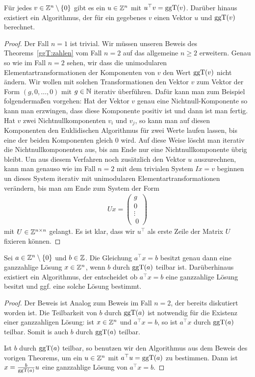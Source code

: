 	\begin{thm} 
		Für jedes $v \in \mathbb Z^n \setminus \{0\}$ gibt es ein $u \in \mathbb Z^n$ mit $u^\top v = \operatorname{ggT}(v)$. Darüber hinaus existiert ein Algorithmus, der für ein gegebenes $v$ einen Vektor $u$ und $\operatorname{ggT}(v)$ berechnet. 
	\end{thm} 
	\begin{proof} 
		Der Fall $n =1$ ist trivial. 
		Wir müssen unseren Beweis des Theorems~\ref{ggT:zahlen} vom Fall $n=2$ auf das allgemeine $n \ge 2$ erweitern. Genau so wie im Fall $n=2$ sehen, wir dass die unimodularen Elementartransformationen der Komponenten von $v$ den Wert $\operatorname{ggT}(v)$ nicht ändern. Wir wollen mit solchen Transformationen den Vektor $v$ zum Vektor der Form $(g,0,\ldots, 0)$ mit $g \in \mathbb N$ iterativ überführen. Dafür kann man zum Beispiel folgendermaßen vorgehen: Hat der Vektor $v$ genau eine Nichtnull-Komponente so kann man erzwingen, dass diese Komponente positiv ist und dann ist man fertig. Hat $v$ zwei Nichtnullkomponenten $v_i$ und $v_j$, so kann man auf diesen Komponenten den Euklidischen Algorithmus für zwei Werte laufen lassen, bis eine der beiden Komponenten gleich $0$ wird. Auf diese Weise löscht man iterativ die Nichtnullkomponenten aus, bis am Ende nur eine Nichtnullkomponente übrig bleibt. Um aus diesem Verfahren noch zusätzlich den Vektor $u$ auszurechnen, kann man genauso wie im Fall $n=2$ mit dem trivialen System $I x = v$ beginnen un dieses System iterativ mit unimodularen Elementartransformationen verändern, bis man am Ende zum System der Form 
		\begin{align*}
			U x = \begin{pmatrix} g \\ 0 \\ \vdots \\\ 0 \end{pmatrix} 
		\end{align*} 
		mit $U \in \mathbb Z^{n \times n}$ gelangt. Es ist klar, dass wir $u^\top$ als erste Zeile der Matrix $U$ fixieren können. 
	\end{proof} 
	
	
	\begin{klr}
		Sei $a \in \mathbb Z^n \setminus \{0\}$ und $b \in \mathbb Z$. Die Gleichung $a^\top x = b$ besitzt genau dann eine ganzzahlige Lösung $x \in \mathbb Z^n$, wenn $b$ durch $\operatorname{ggT}(a)$ teilbar ist. Darüberhinaus existiert ein Algorithmus, der entscheidet ob $a^\top x = b$ eine ganzzahlige Lösung besitzt und ggf. eine solche Lösung bestimmt. 
	\end{klr} 
	\begin{proof} 
		Der Beweis ist Analog zum Beweis im Fall $n=2$, der bereits diskutiert worden ist. Die Teilbarkeit von $b$ durch $\operatorname{ggT}(a)$ ist notwendig für die Existenz einer ganzzahligen Lösung: ist $x \in \mathbb Z^n$ und $a^\top  x = b$, so ist $a^\top x$ durch $\operatorname{ggT}(a)$ teilbar. Somit is auch $b$ durch $\operatorname{ggT}(a)$ teilbar. 
		
		Ist $b$ durch $\operatorname{ggT}(a)$ teilbar, so benutzen wir den Algorithmus aus dem Beweis des vorigen Theorems, um ein $u \in \mathbb Z^n$ mit $a^\top u = \operatorname{ggT}(a)$ zu bestimmen. Dann ist $x = \frac{b}{\operatorname{ggT}(a)} u $ eine ganzzahlige Lösung von $a^\top x = b$. 
	\end{proof} 
	
